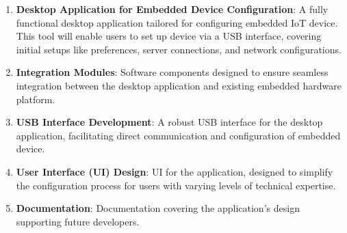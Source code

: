\documentclass[a4paper, 11pt]{article}
\begin{document}
\begin{enumerate}
  \item \textbf{Desktop Application for Embedded Device Configuration}: A fully functional desktop application tailored for configuring embedded IoT device. This tool will enable users to set up device via a USB interface, covering initial setups like preferences, server connections, and network configurations.
  \item \textbf{Integration Modules}: Software components designed to ensure seamless integration between the desktop application and existing embedded hardware platform.

  \item \textbf{USB Interface Development}: A robust USB interface for the desktop application, facilitating direct communication and configuration of embedded device.
  
  \item \textbf{User Interface (UI) Design}: UI for the application, designed to simplify the configuration process for users with varying levels of technical expertise.
  
  \item \textbf{Documentation}: Documentation covering the application's design supporting future developers.

\end{enumerate}
\end{document}
